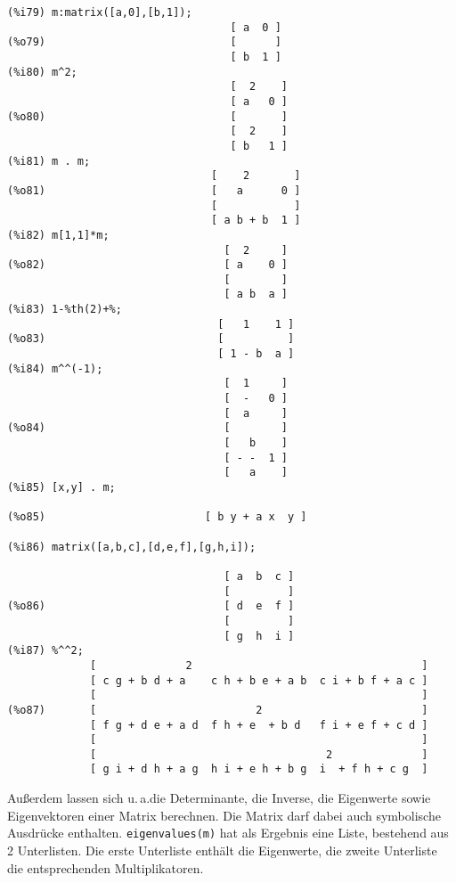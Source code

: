 \documentclass[12pt]{scrartcl}
\newcommand*\ua{u.\,a.\xspace}
\begin{document}
\begin{verbatim}
(%i79) m:matrix([a,0],[b,1]);
                                   [ a  0 ]
(%o79)                             [      ]
                                   [ b  1 ]
(%i80) m^2;
                                   [  2    ]
                                   [ a   0 ]
(%o80)                             [       ]
                                   [  2    ]
                                   [ b   1 ]
(%i81) m . m;
                                [    2       ]
(%o81)                          [   a      0 ]
                                [            ]
                                [ a b + b  1 ]
(%i82) m[1,1]*m;
                                  [  2     ]
(%o82)                            [ a    0 ]
                                  [        ]
                                  [ a b  a ]
(%i83) 1-%th(2)+%;
                                 [   1    1 ]
(%o83)                           [          ]
                                 [ 1 - b  a ]
(%i84) m^^(-1);
                                  [  1     ]
                                  [  -   0 ]
                                  [  a     ]
(%o84)                            [        ]
                                  [   b    ]
                                  [ - -  1 ]
                                  [   a    ]
(%i85) [x,y] . m;

(%o85)                         [ b y + a x  y ]

(%i86) matrix([a,b,c],[d,e,f],[g,h,i]);

                                  [ a  b  c ]
                                  [         ]
(%o86)                            [ d  e  f ]
                                  [         ]
                                  [ g  h  i ]
(%i87) %^^2;
             [              2                                    ]
             [ c g + b d + a    c h + b e + a b  c i + b f + a c ]
             [                                                   ]
(%o87)       [                         2                         ]
             [ f g + d e + a d  f h + e  + b d   f i + e f + c d ]
             [                                                   ]
             [                                    2              ]
             [ g i + d h + a g  h i + e h + b g  i  + f h + c g  ]
\end{verbatim}

Außerdem lassen sich \ua\@ die Determinante, die Inverse, die
Eigenwerte sowie Eigenvektoren einer Matrix berechnen. Die Matrix darf
dabei auch symbolische Ausdrücke enthalten. \texttt{eigenvalues(m)}
hat als Ergebnis eine Liste, bestehend aus 2 Unterlisten. Die erste
Unterliste enthält die Eigenwerte, die zweite Unterliste die
entsprechenden Multiplikatoren.
\end{document}
